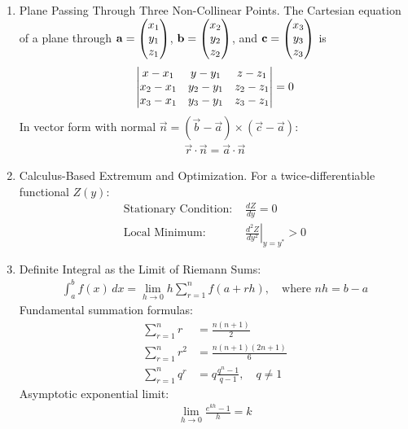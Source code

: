 \begin{enumerate}[label=\thesubsection.\arabic*, ref=\thesubsection.\theenumi]
		\item Plane Passing Through Three Non-Collinear Points.
		The Cartesian equation of a plane through $\mathbf{a} = \begin{pmatrix}x_1 \\ y_1 \\ z_1\end{pmatrix}$, $\mathbf{b} = \begin{pmatrix}x_2 \\ y_2 \\ z_2\end{pmatrix}$, and $\mathbf{c} = \begin{pmatrix}x_3 \\ y_3 \\ z_3\end{pmatrix}$ is
		\begin{align}
			\begin{vmatrix}
				x - x_1 & y - y_1 & z - z_1 \\
				x_2 - x_1 & y_2 - y_1 & z_2 - z_1 \\
				x_3 - x_1 & y_3 - y_1 & z_3 - z_1
			\end{vmatrix} = 0 \label{eq:CBSE12-2019-plane_three_points}
		\end{align}
		In vector form with normal $\vec{n} = (\vec{b} - \vec{a}) \times (\vec{c} - \vec{a})$:
		\begin{align}
			\vec{r} \cdot \vec{n} = \vec{a} \cdot \vec{n} \label{eq:CBSE12-2019-plane_vector_normal}
		\end{align}
		
		\item Calculus-Based Extremum and Optimization.
		For a twice-differentiable functional $Z(y)$:
		\begin{align}
			\text{Stationary Condition: } & \frac{dZ}{dy} = 0 \label{eq:CBSE12-2019-extrema_first} \\
			\text{Local Minimum: } & \left.\frac{d^2Z}{dy^2}\right|_{y=y^*} > 0 \label{eq:CBSE12-2019-extrema_second}
		\end{align}
		
		\item Definite Integral as the Limit of Riemann Sums:
		\begin{align}
			\int_{a}^{b} f(x) \, dx = \lim_{h \to 0} h \sum_{r=1}^{n} f(a + rh), \quad \text{where } nh = b - a \label{eq:CBSE12-2019-riemann_limit}
		\end{align}
		Fundamental summation formulas:
		\begin{align}
			\sum_{r=1}^{n} r &= \frac{n(n + 1)}{2} \label{eq:CBSE12-2019-sum_r} \\
			\sum_{r=1}^{n} r^2 &= \frac{n(n + 1)(2n + 1)}{6} \label{eq:CBSE12-2019-sum_r2} \\
			\sum_{r=1}^{n} q^r &= q \frac{q^n - 1}{q - 1}, \quad q \neq 1 \label{eq:CBSE12-2019-sum_geom}
		\end{align}
		Asymptotic exponential limit:
		\begin{align}
			\lim_{h \to 0} \frac{e^{kh} - 1}{h} = k \label{eq:CBSE12-2019-exp_limit}
		\end{align}
		

\end{enumerate}
